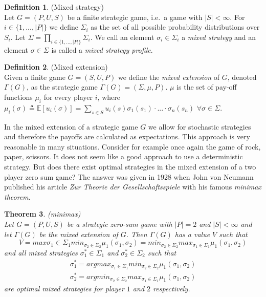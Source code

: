 \documentclass{article}
\newtheorem{theorem}{Theorem}[section]
\theoremstyle{definition}
\newtheorem{definition}[theorem]{Definition}
\theoremstyle{remark}
\begin{document}
\begin{definition}(Mixed strategy)\label{mixed strategy}\\
  Let $G = (P,U,S)$ be a finite strategic game, i.e.\ a game with $|S|
  < \infty $. For $i \in \{1,...,|P|\}$ we define $\Sigma_i$ as the set
  of all possible probability distributions over $S_i$. Let
  $\Sigma = \prod_{i \in \{1,...,|P| \}} \Sigma_i$. We call an element
    $\sigma_i \in \Sigma_i$ a \emph{mixed strategy} and
  an element $\sigma \in \Sigma$ is called a \emph{mixed strategy
    profile}. \citep{Gonzalez-Diaz2010}
  \end{definition}


  \begin{definition}(Mixed extension)\label{Mixed extension}\\
Given a finite game $G = (S,U,P)$ we define the \emph{mixed
  extension} of $G$, denoted $\Gamma(G)$, as the strategic game
$\Gamma(G) = (\Sigma,\mu,P)$. $\mu$ is the set
of pay-off functions $\mu_i$ for every player $i$, where $\mu _i(\sigma) \triangleq \mathbb{E}[u_i(\sigma
  )] =\sum_{s\in S} u_i(s)\sigma_1(s_1) \cdot...\cdot \sigma_n(s_n)$ $\forall
\sigma \in \Sigma$. \citep{Gonzalez-Diaz2010}\\ 
\end{definition}

In the mixed extension of a strategic game $G$ we allow for stochastic
strategies and therefore the payoffs are calculated as
expectations. This approach is very reasonable in many
situations. Consider for example once again the game of rock, paper, scissors. It does not seem like a good approach to use a deterministic
strategy. But does there exist optimal strategies in the mixed
extension of a two player zero sum game? The answer was given in 1928
when John von Neumann published his article \emph{Zur Theorie der
  Gesellschaftsspiele} with his famous \emph{minimax theorem}.

\begin{theorem}(minimax)\\
Let $G = (P,U,S)$ be a strategic zero-sum game with $|P| = 2$ and $|S|
< \infty$ and let $\Gamma (G)$ be the mixed extension of $G$. Then
$\Gamma (G)$ has a value $V$ such that
\begin{equation}
  V = max{\sigma _1 \in
  \Sigma_1} min_{\sigma _2 \in \Sigma_2} \mu_1(\sigma_1,\sigma_2) = min_{\sigma _2 \in
  \Sigma_2} max_{\sigma _1 \in \Sigma_1} \mu_1(\sigma_1,\sigma_2)
\end{equation}
and all mixed strategies $\sigma _1^* \in \Sigma_1$ and $\sigma _2^*
\in \Sigma_2$ such that
\begin{equation}
  \begin{gathered}
\sigma_1^* = argmax_{\sigma _1 \in
  \Sigma_1} min_{\sigma _2 \in \Sigma_2} \mu_1(\sigma_1,\sigma_2)\\
 \sigma_2^* = argmin_{\sigma _2 \in \Sigma_2} max_{\sigma _1 \in
   \Sigma_1} \mu_1(\sigma_1,\sigma_2)
\end{gathered}
\end{equation}
 are optimal mixed strategies for player $1$ and $2$ respectively.
\end{theorem}
\end{document}
